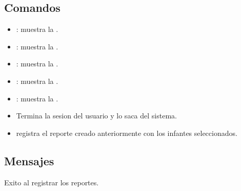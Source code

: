 \subsection{Comandos}
\begin{itemize}
	\item {}: muestra la .
        \item {}: muestra la .
        \item {}: muestra la .
        \item {}: muestra la .
        \item {}: muestra la .
        \item {}Termina la sesion del usuario y lo saca del sistema.
        \item {} registra el reporte creado anteriormente con los infantes seleccionados.
\end{itemize}

\subsection{Mensajes}

\begin{Citemize}
	\item Exito al registrar los reportes.
\end{Citemize}


